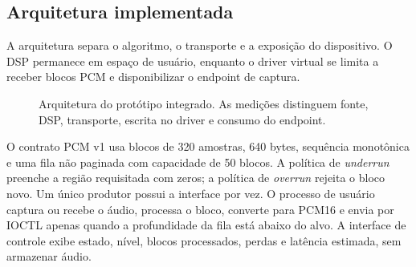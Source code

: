\subsection{Arquitetura implementada}

A arquitetura separa o algoritmo, o transporte e a exposição do dispositivo. O DSP permanece em espaço de usuário, enquanto o driver virtual se limita a receber blocos PCM e disponibilizar o endpoint de captura.

\begin{figure}[!htbp]
\centering
{}
\caption{Arquitetura do protótipo integrado. As medições distinguem fonte, DSP, transporte, escrita no driver e consumo do endpoint.}
\label{fig:arquitetura-integrada}
\end{figure}
\FloatBarrier

O contrato PCM v1 usa blocos de 320 amostras, 640 bytes, sequência monotônica e uma fila não paginada com capacidade de 50 blocos. A política de \textit{underrun} preenche a região requisitada com zeros; a política de \textit{overrun} rejeita o bloco novo. Um único produtor possui a interface por vez. O processo de usuário captura ou recebe o áudio, processa o bloco, converte para PCM16 e envia por IOCTL apenas quando a profundidade da fila está abaixo do alvo. A interface de controle exibe estado, nível, blocos processados, perdas e latência estimada, sem armazenar áudio.

